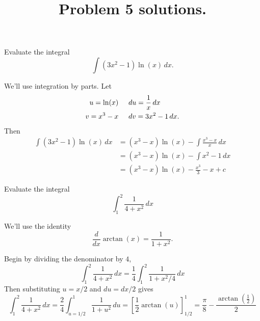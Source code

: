 \documentclass{article}
\newenvironment{problem}[2][Problem]{\begin{trivlist}
\item[\hskip \labelsep {\bfseries #1}\hskip \labelsep {\bfseries #2.}]}{\end{trivlist}}
\newenvironment{solution}[1][Solution.]{\begin{trivlist}
\item[\hskip \labelsep {\bfseries #1}]}{\end{trivlist}}
\begin{document}
\title{Problem 5 solutions.}
\date{}

\maketitle

\begin{problem}{1}
  Evaluate the integral \[
    \int(3x^2 - 1)\ln(x)\, dx.
  \]
\end{problem}

\begin{solution} $ $\\
  We'll use integration by parts. Let \begin{align*}
    u = \ln(x)  &\hspace{0.5cm} du = \frac{1}{x}\,dx \\
    v = x^3 - x &\hspace{0.5cm} dv = 3x^2 - 1 \,dx.
  \end{align*}
  Then \begin{align*}
    \int(3x^2 - 1)\ln(x)\, dx
    &= (x^3 - x)\ln(x) - \int \frac{x^3 - x}{x}\, dx \\
    &= (x^3 - x)\ln(x) - \int x^2 - 1\, dx \\
    &= (x^3 - x)\ln(x) - \frac{x^3}{3} - x + c
  \end{align*}
\end{solution}
\begin{problem}{2}
  Evaluate the integral \[
    \int_1^2 \frac{1}{4+x^2}\,dx
  \]
\end{problem}

\begin{solution} $ $\\
  We'll use the identity \[
    \frac{d}{dx}\arctan(x) = \frac{1}{1+x^2}.
  \]

  Begin by dividing the denominator by $4$, \[
    \int_1^2 \frac{1}{4+x^2}\,dx = \frac{1}{4} \int_1^2 \frac{1}{1+x^2/4}\,dx
  \]
  Then substituting $u = x/2$ and $du = dx/2$ gives \[
    \int_1^2 \frac{1}{4+x^2}\,dx
    = \frac{2}{4}\int_{u=1/2}^1 \frac{1}{1+u^2}\,du
    = \left[\frac{1}{2}\arctan(u)\right]_{1/2}^1
    = \frac{\pi}{8} - \frac{\arctan(\frac{1}{2})}{2}
  \]
\end{solution}
\end{document}
